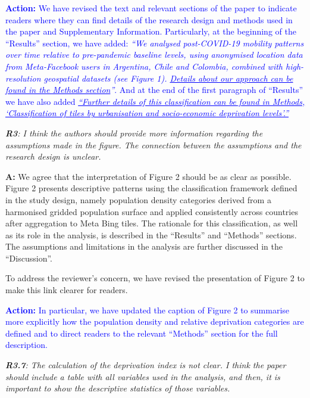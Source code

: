 \documentclass[12pt,a4paper,oneside, reqno]{amsart}
\begin{document}
\textcolor{blue}{
\textbf{Action:} We have revised the text and relevant sections of the paper to indicate readers where they can find details of the research design and methods used in the paper and Supplementary Information. Particularly, at the beginning of the ``Results'' section, we have added: \textit{``We analysed post-COVID-19 mobility patterns over time relative to pre-pandemic baseline levels, using anonymised location data from Meta-Facebook users in Argentina, Chile and Colombia, combined with high-resolution geospatial datasets (see Figure 1). \ul{Details about our approach can be found in the Methods section}''}. And at the end of the first paragraph of ``Results'' we have also added \textit{\uline{``Further details of this classification can be found in Methods, `Classification of tiles by urbanisation and socio-economic deprivation levels'.''}}
}

\setlength{\leftskip}{1cm} \textit{\textbf{R3}: I think the authors should provide more information regarding the assumptions made in the figure. The connection between the assumptions and the research design is unclear.}

\setlength{\leftskip}{1cm}\textbf{A:} We agree that the interpretation of Figure 2 should be as clear as possible. Figure 2 presents descriptive patterns using the classification framework defined in the study design, namely population density categories derived from a harmonised gridded population surface and applied consistently across countries after aggregation to Meta Bing tiles. The rationale for this classification, as well as its role in the analysis, is described in the ``Results'' and ``Methods'' sections. The assumptions and limitations in the analysis are further discussed in the ``Discussion''.

To address the reviewer’s concern, we have revised the presentation of Figure 2 to make this link clearer for readers. 

\textcolor{blue}{\textbf{Action:} In particular, we have updated the caption of Figure 2 to summarise more explicitly how the population density and relative deprivation categories are defined and to direct readers to the relevant ``Methods'' section for the full description.}

\setlength{\leftskip}{0cm} \textit{\textbf{R3.7}: The calculation of the deprivation index is not clear. I think the paper should include a table with all variables used in the analysis, and then, it is important to show the descriptive statistics of those variables.}
\end{document}
